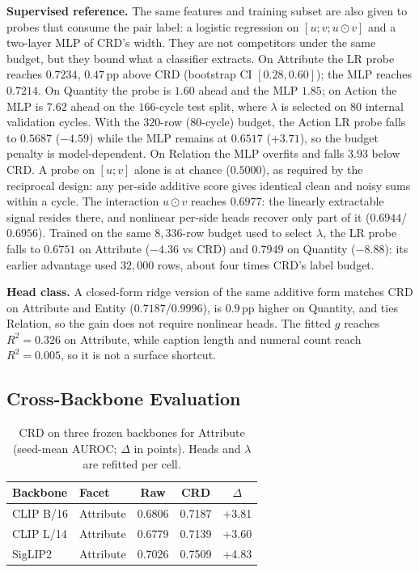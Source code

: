 \textbf{Supervised reference.} The same features and training subset are also given
to probes that consume the pair label: a logistic regression on $[u;v;u\odot v]$ and
a two-layer MLP of CRD's width. They are not competitors under the same budget, but
they bound what a classifier extracts. On Attribute the LR probe reaches $0.7234$,
$0.47$\,pp above CRD (bootstrap CI $[0.28,0.60]$); the MLP reaches $0.7214$. On
Quantity the probe is $1.60$ ahead and the MLP $1.85$; on Action the MLP is $7.62$
ahead on the $166$-cycle test split, where $\lambda$ is selected on $80$ internal
validation cycles. With the $320$-row ($80$-cycle) budget, the Action LR probe falls
to $0.5687$ ($-4.59$) while the MLP remains at $0.6517$ ($+3.71$), so the budget
penalty is model-dependent. On Relation the MLP overfits and falls
$3.93$ below CRD. A probe on $[u;v]$ alone is at chance ($0.5000$), as required by
the reciprocal design: any per-side additive score gives identical clean and noisy
sums within a cycle. The interaction $u\odot v$ reaches $0.6977$: the linearly
extractable signal resides there, and nonlinear per-side heads recover only part of
it ($0.6944$/$0.6956$). Trained on the same $8{,}336$-row budget used to select
$\lambda$, the LR probe falls to $0.6751$ on Attribute ($-4.36$ vs CRD) and $0.7949$
on Quantity ($-8.88$): its earlier advantage used $32{,}000$ rows, about four times
CRD's label budget.

\textbf{Head class.} A closed-form ridge version of the same additive form matches
CRD on Attribute and Entity ($0.7187$/$0.9996$), is $0.9$\,pp higher on Quantity,
and ties Relation, so the gain does not require nonlinear heads. The fitted $g$
reaches $R^2=0.326$ on Attribute, while caption length and numeral count reach
$R^2=0.005$, so it is not a surface shortcut.

\subsection{Cross-Backbone Evaluation}
\label{sec:cross}
\begin{table}[t]
\centering
\small
\setlength{\tabcolsep}{3.5pt}
\caption{CRD on three frozen backbones for Attribute (seed-mean AUROC; $\Delta$ in
points). Heads and $\lambda$ are refitted per cell.}
\label{tab:cross}
\begin{tabular}{llccc}
\toprule
Backbone & Facet & Raw & CRD & $\Delta$ \\
\midrule
CLIP B/16  & Attribute & 0.6806 & 0.7187 & +3.81 \\
CLIP L/14  & Attribute & 0.6779 & 0.7139 & +3.60 \\
SigLIP2    & Attribute & 0.7026 & 0.7509 & +4.83 \\
\bottomrule
\end{tabular}
\end{table}


